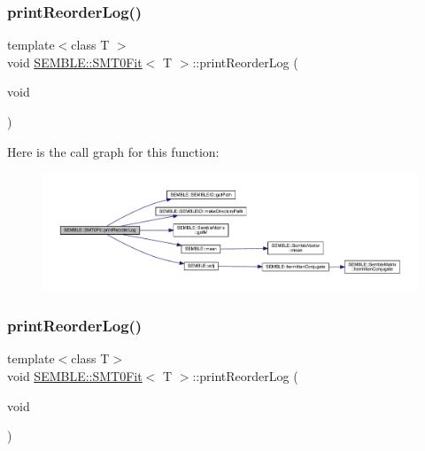 \mbox{\label{structSEMBLE_1_1SMT0Fit_aa25369b9c7a77b7be15294eabd75427d}} 
\subsubsection{\texorpdfstring{printReorderLog()}{printReorderLog()}\hspace{0.1cm}{\footnotesize\ttfamily [1/2]}}
{\footnotesize\ttfamily template$<$class T $>$ \\
void \mbox{\hyperlink{structSEMBLE_1_1SMT0Fit}{S\+E\+M\+B\+L\+E\+::\+S\+M\+T0\+Fit}}$<$ T $>$\+::print\+Reorder\+Log (\begin{DoxyParamCaption}\item[{void}]{ }\end{DoxyParamCaption})}

Here is the call graph for this function\+:
\nopagebreak
\begin{figure}[H]
\begin{center}
\leavevmode
\includegraphics[width=350pt]{d6/dad/structSEMBLE_1_1SMT0Fit_aa25369b9c7a77b7be15294eabd75427d_cgraph}
\end{center}
\end{figure}
\mbox{\label{structSEMBLE_1_1SMT0Fit_aa25369b9c7a77b7be15294eabd75427d}} 
\subsubsection{\texorpdfstring{printReorderLog()}{printReorderLog()}\hspace{0.1cm}{\footnotesize\ttfamily [2/2]}}
{\footnotesize\ttfamily template$<$class T$>$ \\
void \mbox{\hyperlink{structSEMBLE_1_1SMT0Fit}{S\+E\+M\+B\+L\+E\+::\+S\+M\+T0\+Fit}}$<$ T $>$\+::print\+Reorder\+Log (\begin{DoxyParamCaption}\item[{void}]{ }\end{DoxyParamCaption})}

